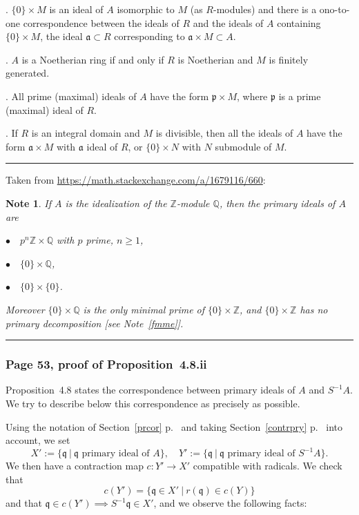 \documentclass[12pt,letterpaper]{article}%
\newcommand{\mf}{\mathfrak}
\newcommand{\aaa}{\mf a}
\newcommand{\ppp}{\mf p}
\newcommand{\qqq}{\mf q}
\newcommand{\nn}{\noindent}
\newtheorem{note}[thm]{Note}
\begin{document}
\nn1. $\{0\}\times M$ is an ideal of $A$ isomorphic to $M$ (as $R$-modules) and there is a ono-to-one correspondence between the ideals of $R$ and the ideals of $A$ containing $\{0\}\times M$, the ideal $\aaa\subset R$ corresponding to $\aaa\times M\subset A$.

\nn2. $A$ is a Noetherian ring if and only if $R$ is Noetherian and $M$ is finitely generated.

\nn3. All prime (maximal) ideals of $A$ have the form $\ppp\times M$, where $\ppp$ is a prime (maximal) ideal of $R$.

\nn4. If $R$ is an integral domain and $M$ is divisible, then all the ideals of $A$ have the form $\aaa\times M$ with $\aaa$ ideal of $R$, or $\{0\}\times N$ with $N$ submodule of $M$.\bigskip\bigskip

\hrule\bigskip%

\nn Taken from \href{https://math.stackexchange.com/a/1679116/660}{https://math.stackexchange.com/a/1679116/660}:\bigskip 

\begin{note}%
If $A$ is the idealization of the $\mathbb Z$-module $\mathbb Q$, then the primary ideals of $A$ are  

\nn$\bullet\quad p^n\mathbb Z\times\mathbb Q$ with $p$ prime, $n\ge1$, 

\nn$\bullet\quad\{0\}\times\mathbb Q$,

\nn$\bullet\quad\{0\}\times\{0\}$. 

\nn Moreover $\{0\}\times\mathbb Q$ is the only minimal prime of $\{0\}\times\mathbb Z$, and $\{0\}\times\mathbb Z$ has no primary decomposition [see Note~\ref{fmme}].
\end{note}\bigskip

\hrule\bigskip

\subsubsection{Page 53, proof of Proposition~4.8.ii}\label{prycor}%

Proposition~4.8 states the correspondence between primary ideals of $A$ and $S^{-1}A$. We try to describe below this correspondence as precisely as possible.

Using the notation of Section~\ref{prcor} p.~\pageref{prcor} and taking Section~\ref{contrpry} p.~\pageref{contrpry} into account, we set 
$$
X':=\{\qqq\ |\ \qqq\text{ primary ideal of }A\},\quad Y':=\{\qqq\ |\ \qqq\text{ primary ideal of }S^{-1}A\}.
$$ 
We then have a contraction map $c:Y'\to X'$ compatible with radicals. We check that  
$$
c(Y')=\{\qqq\in X'\ |\ r(\qqq)\in c(Y)\}
$$ 
and that $\qqq\in c(Y')\implies S^{-1}\qqq\in X'$, and we observe the following facts: 
\end{document}
